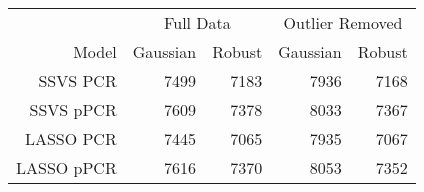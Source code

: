 \begingroup\small
\begin{tabular}{rrrrr}
  \hline
  \multicolumn{1}{r}{} & \multicolumn{2}{c}{Full Data} & \multicolumn{2}{c}{Outlier Removed} \\
 Model & Gaussian & Robust & Gaussian & Robust \\
 \hline
SSVS PCR & 7499 & 7183 & 7936 & 7168 \\ 
  SSVS pPCR & 7609 & 7378 & 8033 & 7367 \\ 
  LASSO PCR & 7445 & 7065 & 7935 & 7067 \\ 
  LASSO pPCR & 7616 & 7370 & 8053 & 7352 \\ 
   \hline
\end{tabular}
\endgroup
